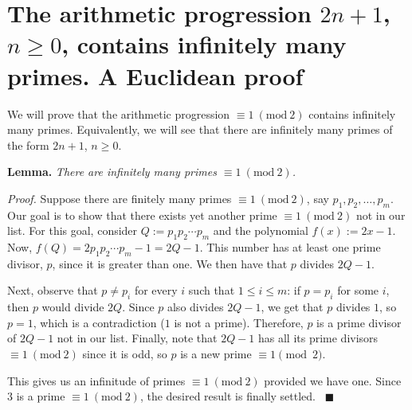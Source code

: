 \documentclass[a4paper, 12pt]{article}
\theoremstyle{definition}
\newcommand{\Mod}[1]{\ (\mathrm{mod}\ #1)} %
\renewcommand\title{\textbf{The arithmetic progression $2n+1$, $n\geqslant0$, contains infinitely many primes.\\ A Euclidean proof}}
\begin{document}
	\thispagestyle{plain}
	\sloppy
	\section{The arithmetic progression $2n+1$, $n\geqslant0$, contains infinitely many primes. A Euclidean proof}

	We will prove that the arithmetic progression $\equiv 1 \Mod{2}$ contains infinitely many primes. Equivalently, we will see that there are infinitely many primes of the form $2n+1$, $n\geqslant0$.
    
	\textbf{Lemma.} \emph{There are infinitely many primes $\equiv 1\Mod{2}$.}
    
	\textit{Proof.} Suppose there are finitely many primes $\equiv 1 \Mod{2}$, say $p_1, p_2,\dots,p_m$. Our goal is to show that there exists yet another prime $\equiv 1 \Mod{2}$ not in our list. For this goal, consider $Q:=p_1p_2\cdots p_m$ and the polynomial $f(x):=2x-1$. Now, $f(Q) = 2p_1p_2\cdots p_m-1=2Q-1$. This number has at least one prime divisor, $p$, since it is greater than one. We then have that $p$ divides $2Q-1$.

Next, observe that $p\neq p_i$ for every $i$ such that $1\leqslant i \leqslant m$: if $p=p_i$ for some $i$, then $p$ would divide $2Q$. Since $p$ also divides $2Q-1$, we get that $p$ divides $1$, so $p=1$, which is a contradiction ($1$ is not a prime). Therefore, $p$ is a prime divisor of $2Q-1$ not in our list. Finally, note that $2Q-1$ has all its prime divisors $\equiv 1 \Mod{2}$ since it is odd, so $p$ is a new prime $\equiv 1 \pmod{2}$.

This gives us an infinitude of primes $\equiv 1 \Mod{2}$ provided we have one. Since $3$ is a prime $\equiv 1 \Mod{2}$, the desired result is finally settled. \ $\blacksquare$
	
\end{document}
